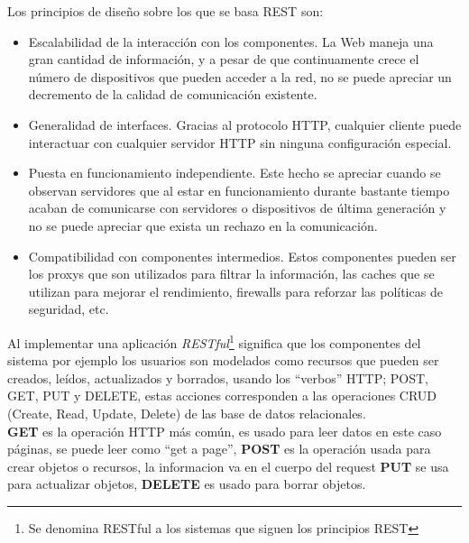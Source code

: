 Los principios de diseño sobre los que se basa REST son:
\begin{itemize}
  \item Escalabilidad de la interacción con los componentes. La Web maneja una gran cantidad de información, y a pesar de que continuamente crece el número de dispositivos que pueden acceder a la red, no se puede apreciar un decremento de la calidad de comunicación existente.

  \item Generalidad de interfaces. Gracias al protocolo HTTP, cualquier cliente puede interactuar con cualquier servidor HTTP sin ninguna configuración especial.

  \item Puesta en funcionamiento independiente. Este hecho se apreciar cuando se observan servidores que al estar en funcionamiento durante bastante tiempo acaban de comunicarse con servidores o dispositivos de última generación y no se puede apreciar que exista un rechazo en la comunicación.

  \item Compatibilidad con componentes intermedios. Estos componentes pueden ser los proxys que son utilizados para filtrar la información, las caches que se utilizan para mejorar el rendimiento, firewalls para reforzar las políticas de seguridad, etc. \cite{rest_web_service}

\end{itemize}

 Al implementar una aplicación \emph{RESTful}\footnote{Se denomina RESTful a los sistemas que siguen los principios REST} significa que los componentes del sistema por ejemplo los usuarios son modelados como recursos que pueden ser creados, leídos, actualizados y borrados, usando los ``verbos'' HTTP; POST, GET, PUT y DELETE, estas acciones corresponden a las operaciones CRUD (Create, Read, Update, Delete) de las base de datos relacionales.\\



\textbf{GET} es la operación HTTP más común, es usado para leer
datos en este caso páginas, se puede leer como ``get a page'',
\textbf{POST} es la operación usada para crear objetos o recursos, la informacion va en el cuerpo del request
\textbf{PUT} se usa para actualizar objetos,
\textbf{DELETE} es usado para borrar objetos. \\

